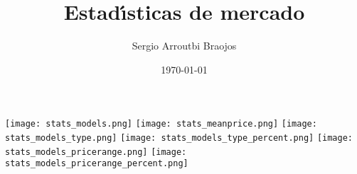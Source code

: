 \documentclass[11pt]{article}
\title{\textbf{Estad\'\i{}sticas de mercado}}
\author{Sergio Arroutbi Braojos}
\date{\today}
\begin{document}
\begin{landscape}
\texttt{[image: stats\_models.png]}
\pagebreak
\texttt{[image: stats\_meanprice.png]}
\pagebreak
\texttt{[image: stats\_models\_type.png]}
\pagebreak
\texttt{[image: stats\_models\_type\_percent.png]}
\pagebreak
\texttt{[image: stats\_models\_pricerange.png]}
\pagebreak
\texttt{[image: stats\_models\_pricerange\_percent.png]}
\end{landscape}
\end{document}

